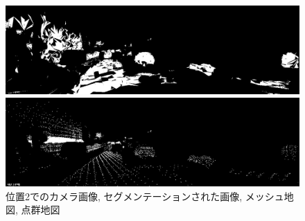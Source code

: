 \begin{figure}[htbp]
\begin{minipage}[b]{0.50\hsize}
\begin{center}
  \end{center}
 \end{minipage} \\
   \begin{minipage}[b]{0.50\hsize}
 \begin{center}
  \includegraphics[keepaspectratio, scale=0.18]{./picture/valued_mesh_map_image/image1.jpg}
  \end{center}
 \end{minipage}
 \begin{minipage}[b]{0.50\hsize}
 \begin{center}
  \includegraphics[keepaspectratio, scale=0.18]{./picture/valued_point_map_image/image1.jpg}
  \end{center}
 \end{minipage}
 \caption{位置2でのカメラ画像, セグメンテーションされた画像, メッシュ地図, 点群地図}\label{fig:place2}
\end{figure}

